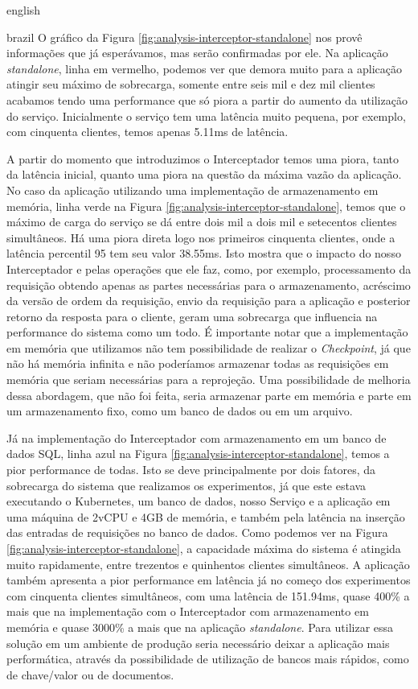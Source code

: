 \begin{otherlanguage*}{english}
\begin{otherlanguage*}{brazil}
O gráfico da Figura \ref{fig:analysis-interceptor-standalone} nos provê informações que já
esperávamos, mas serão confirmadas por ele. Na aplicação \textit{standalone}, linha em vermelho,
podemos ver que demora muito para a aplicação atingir seu máximo de sobrecarga, somente entre
seis mil e dez mil clientes acabamos tendo uma performance que só piora a partir do aumento
da utilização do serviço. Inicialmente o serviço tem uma latência muito pequena, por exemplo,
com cinquenta clientes, temos apenas 5.11ms de latência.

A partir do momento que introduzimos o Interceptador temos uma piora, tanto da latência inicial,
quanto uma piora na questão da máxima vazão da aplicação. No caso da aplicação utilizando uma
implementação de armazenamento em memória, linha verde na Figura \ref{fig:analysis-interceptor-standalone},
temos que o máximo de carga do serviço se dá entre dois mil a dois mil e setecentos clientes
simultâneos. Há uma piora direta logo nos primeiros cinquenta clientes, onde a latência
percentil 95 tem seu valor 38.55ms. Isto mostra que o impacto do nosso Interceptador e pelas
operações que ele faz, como, por exemplo, processamento da requisição obtendo apenas as
partes necessárias para o armazenamento, acréscimo da versão de ordem da requisição,
envio da requisição para a aplicação e posterior retorno da resposta para o cliente, geram
uma sobrecarga que influencia na performance do sistema como um todo. É importante notar que
a implementação em memória que utilizamos não tem possibilidade de realizar o \textit{Checkpoint},
já que não há memória infinita e não poderíamos armazenar todas as requisições em memória
que seriam necessárias para a reprojeção. Uma possibilidade de melhoria dessa abordagem,
que não foi feita, seria armazenar parte em memória e parte em um armazenamento fixo, como
um banco de dados ou em um arquivo.

Já na implementação do Interceptador com armazenamento em um banco de dados SQL, linha azul
na Figura \ref{fig:analysis-interceptor-standalone}, temos a pior performance de todas. Isto
se deve principalmente por dois fatores, da sobrecarga do sistema que realizamos os experimentos,
já que este estava executando o Kubernetes, um banco de dados, nosso Serviço e a aplicação
em uma máquina de 2vCPU e 4GB de memória, e também pela latência na inserção das entradas
de requisições no banco de dados. Como podemos ver na Figura \ref{fig:analysis-interceptor-standalone},
a capacidade máxima do sistema é atingida muito rapidamente, entre trezentos e quinhentos
clientes simultâneos. A aplicação também apresenta a pior performance em latência já no
começo dos experimentos com cinquenta clientes simultâneos, com uma latência de 151.94ms,
quase 400\% a mais que na implementação com o Interceptador com armazenamento em memória e
quase 3000\% a mais que na aplicação \textit{standalone}. Para utilizar essa solução em
um ambiente de produção seria necessário deixar a aplicação mais performática, através da
possibilidade de utilização de bancos mais rápidos, como de chave/valor ou de documentos.


\end{otherlanguage*}
\end{otherlanguage*}
